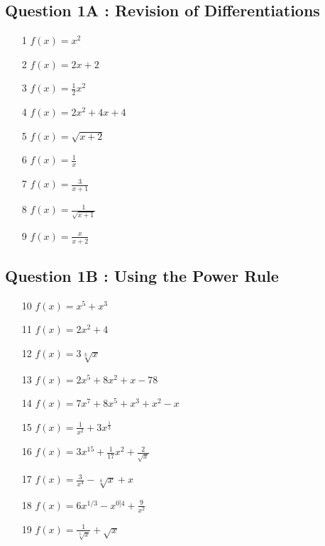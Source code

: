 \documentclass[]{article}
\begin{document}
\subsection*{Question 1A : Revision of Differentiations}
{
\Large
\begin{multicols}{2}
\begin{itemize}
	\item[1] $ f(x) = x^2  $ \,
	\item[2] $ f(x) = 2x + 2  $ \,
	\item[3] $ f(x) = \frac{1}{2}x^2  $ \,
	\item[4] $ f(x) = 2x^2 + 4x + 4  $ \,
	\item[5] $ f(x) = \sqrt{x+2}  $ \,
	\item[6] $ f(x) = \frac{1}{x}  $ \,
	\item[7] $ f(x) = \frac{3}{x+1}  $ \,
	\item[8] $ f(x) = \frac{1}{\sqrt{x+1}}  $ \,
	\item[9] $ f(x) = \frac{x}{x+2}  $ \,
\end{itemize}
\end{multicols}
}

\subsection*{Question 1B : Using the Power Rule}
{
	\Large
	\begin{multicols}{2}
		\begin{itemize}
			\item[10] $f(x) = x^5 + x^3 $
			\item[11] $ f(x) = 2x^2 + 4$ 
			\item[12] $ f(x) = 3\sqrt[3]{x}$ 
			\item[13] $ f(x) = 2x^5+8x^2+x-78$ 
			\item[14] $ f(x) = 7x^7+8x^5+x^3+x^2-x$ \,
			\item[15] $ f(x) = \frac{1}{x^2}+3x^\frac{1}{3}$ \,
			\item[16] $ f(x) = 3x^{15} + \frac{1}{17}x^2 +\frac{2}{\sqrt{x}} $ \,
			\item[17] $ f(x) = \frac{3}{x^4} - \sqrt[4]{x} + x $ \,
			\item[18] $ f(x) = 6x^{1/3}-x^{0]4} +\frac{9}{x^2} $ 
			\item[19] $ f(x) = \frac{1}{\sqrt[3]{x}} + \sqrt{x} $ 
		\end{itemize}
	\end{multicols}
}
\end{document}
